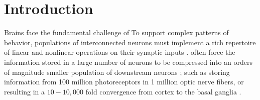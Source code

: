 \section*{Introduction}
\label{sec:introduction}

Brains face the fundamental challenge of 
To support complex patterns of behavior, 
populations of interconnected neurons must implement 
a rich repertoire of linear and nonlinear operations on their synaptic inputs
\cite{Koch1999}.
often force the information stored in a large number of neurons
to be compressed into an orders of magnitude smaller population
of downstream neurons
\cite{Kempermann2002,BarGad2003_Review,Babinsky1993};
such as storing information from 100 million photoreceptors 
in 1 million optic nerve fibers,
or resulting in a $10 - 10,000$ fold convergence from cortex to the basal ganglia
\cite{BarGad2003_Review}.

